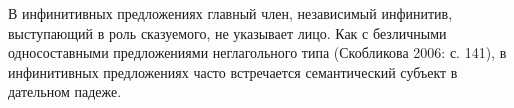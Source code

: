 В инфинитивных предложениях главный член, независимый инфинитив, выступающий в роль сказуемого, не указывает лицо. Как с безличными односоставными предложениями неглагольного типа (Скобликова 2006: с. 141), в инфинитивных предложениях часто встречается семантический субъект в дательном падеже. 


%
%
%

